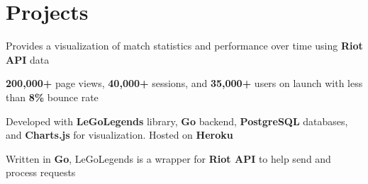 \documentclass[]{peter_resume}
\begin{document}
\begin{minipage}{\textwidth}

\section{Projects}
\begin{comment}
\runsubsection{RaiseMyElo}
\location{\hfill\urlstyle{same}\url{http://raisemyelo.gg}}
\descript{League of Legends improvement service platform}
\begin{tightemize}
\item A platform to connect gamers for coaching and elo improvement services
\item Developed with \textbf{LeGoLegends} library, \textbf{Go} backend, \textbf{PostgreSQL} databases, and \textbf{Charts.js} for visualization. Hosted on \textbf{Heroku}
\end{tightemize} 
\sectionsep
\end{comment}

\begin{tightemize}
\item Provides a visualization of match statistics and performance over time using \textbf{Riot API} data
\item \textbf{200,000+} page views, \textbf{40,000+} sessions, and \textbf{35,000+} users on launch with less than \textbf{8\%} bounce rate
\item Developed with \textbf{LeGoLegends} library, \textbf{Go} backend, \textbf{PostgreSQL} databases, and \textbf{Charts.js} for visualization. Hosted on \textbf{Heroku}
\end{tightemize} 
\sectionsep

\location{}
\begin{tightemize}
\item Written in \textbf{Go}, LeGoLegends is a wrapper for \textbf{Riot API} to help send and process requests
\end{tightemize} 
\sectionsep

\vspace{0.1cm}

\vspace{0.1cm}




\end{minipage}
\end{document}
